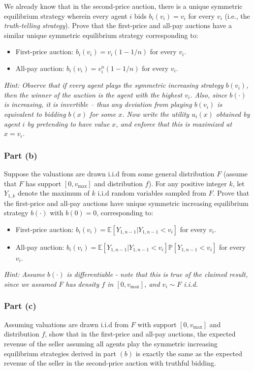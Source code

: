 \documentclass[letterpaper,11pt]{article}
\begin{document}
We already know that in the second-price auction, there is a unique symmetric equilibrium strategy wherein every agent $i$ bids $b_i(v_i) = v_i$ for every $v_i$ (i.e., the \emph{truth-telling strategy}). Prove that the first-price and all-pay auctions have a similar unique symmetric equilibrium strategy corresponding to: 
\begin{itemize}[nosep]
\item First-price auction: $b_i(v_i) = v_i (1 -1/n)$ for every $v_i$.
\item All-pay auction: $b_i(v_i) = v_i^n (1 -1/n)$ for every $v_i$.
\end{itemize}

\noindent\emph{Hint: Observe that if every agent plays the symmetric increasing strategy $b(v_i)$, then the winner of the auction is the agent with the highest $v_i$. Also, since $b(\cdot)$ is increasing, it is invertible -- thus any deviation from playing $b(v_i)$ is equivalent to bidding $b(x)$ for some $x$.
Now write the utility $u_i(x)$ obtained by agent $i$ by pretending to have value $x$, and enforce that this is maximized at $x=v_i$.}

\subsubsection*{Part (b)} 
Suppose the valuations are drawn i.i.d from some general distribution $F$ (assume that $F$ has support $[0,v_{\max}]$ and distribution $f$). For any positive integer $k$, let $Y_{1,k}$ denote the maximum of $k$ i.i.d random variables sampled from $F$.
Prove that the first-price and all-pay auctions have unique symmetric increasing equilibrium strategy $b(\cdot)$ with $b(0) = 0$, corresponding to: 
\begin{itemize}[nosep]
\item First-price auction: $b_i(v_i) = \mathbb{E}[Y_{1,n-1}|Y_{1,n-1}<v_i]$ for every $v_i$.
\item All-pay auction: $b_i(v_i) =  \mathbb{E}[Y_{1,n-1}|Y_{1,n-1}<v_i]\mathbb{P}[Y_{1,n-1}<v_i]$ for every $v_i$.
\end{itemize}

\noindent\emph{Hint: Assume $b(\cdot)$ is differentiable - note that this is true of the claimed result, since we assumed $F$ has density $f$ in $[0,v_{\max}]$, and $v_i\sim F$ i.i.d.}


\subsubsection*{Part (c)} 
Assuming valuations are drawn i.i.d from $F$ with support $[0,v_{\max}]$ and distribution $f$, show that in the first-price and all-pay auctions, the expected revenue of the seller assuming all agents play the symmetric increasing equilibrium strategies derived in part $(b)$ is exactly the same as the expected revenue of the seller in the second-price auction with truthful bidding.
\end{document}
